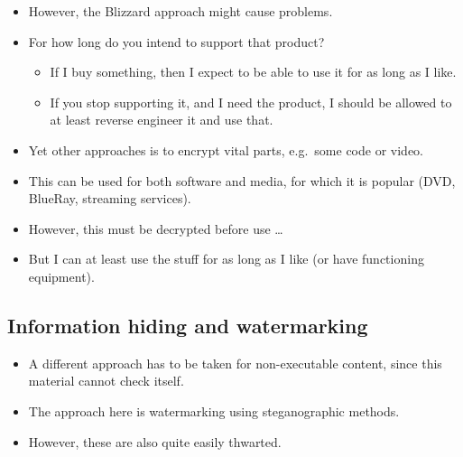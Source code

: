 \begin{frame}
  \begin{itemize}
    \item However, the Blizzard approach might cause problems.
    \item For how long do you intend to support that product?
      \begin{itemize}
        \item If I buy something, then I expect to be able to use it for as 
          long as I like.
        \item If you stop supporting it, and I need the product, I should be 
          allowed to at least reverse engineer it and use that.
      \end{itemize}
  \end{itemize}
\end{frame}

\begin{frame}
  \begin{itemize}
    \item Yet other approaches is to encrypt vital parts, e.g.\ some code or 
      video.

    \item This can be used for both software and media, for which it is popular 
      (DVD, BlueRay, streaming services).

    \item However, this must be decrypted before use \dots

    \item But I can at least use the stuff for as long as I like (or have 
      functioning equipment).
  \end{itemize}
\end{frame}

\subsection{Information hiding and watermarking}

\begin{frame}
  \begin{itemize}
    \item A different approach has to be taken for non-executable content, 
      since this material cannot check itself.

    \item The approach here is watermarking using steganographic 
      methods.

    \item However, these are also quite easily thwarted.
  \end{itemize}
\end{frame}

